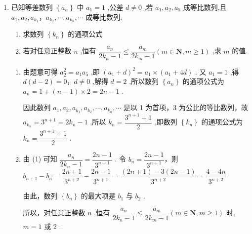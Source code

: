 \begin{enumerate}
\begin{enumerate}
\begin{jieda}
        \end{jieda}
        \item 已知等差数列 $\left\{{a}_{n}\right\}$ 中 ${a}_{1} = 1$ ,公差 $d \neq  0$ ,若 ${a}_{1},{a}_{2},{a}_{5}$ 成等比数列,且 ${a}_{1},{a}_{2},{a}_{{k}_{1}}$，${a}_{{k}_{2}},\cdots ,{a}_{{k}_{n}},\cdots$ 成等比数列.
        \begin{enumerate}
            \item 求数列 $\left\{  {k}_{n}\right\}$ 的通项公式
            \item 若对任意正整数 $n$ ,恒有 $\dfrac{{a}_{n}}{2{k}_{n} - 1} \leq  \dfrac{{a}_{m}}{2{k}_{m} - 1}\left( {m \in  \mathbf{N},m \geq  1}\right)$ ,求 $m$ 的值.
        \end{enumerate}
        \begin{jieda}
            \begin{enumerate}
                \item 由题意可得 ${a}_{2}^{2} = {a}_{1}{a}_{5}$ ,即 ${\left( {a}_{1} + d\right) }^{2} = {a}_{1} \times  \left( {{a}_{1} + {4d}}\right)$ . 又 ${a}_{1} = 1$ ,得 $d\left( {d - 2}\right)  = 0$，$d \neq  0$ ,解得 $d = 2$ ,所以数列 $\left\{  {a}_{n}\right\}$ 的通项公式为 ${a}_{n} = 1 + \left( {n - 1}\right)  \times  2 = {2n} - 1$ .
                
                因此数列 ${a}_{1},{a}_{2},{a}_{{k}_{1}},{a}_{{k}_{2}},\cdots ,{a}_{{k}_{n}},\cdots$ 是以 1 为首项，3 为公比的等比数列，故${a}_{{k}_{n}} = {3}^{n + 1} = 2{k}_{n} - 1$ ,所以 ${k}_{n} = \dfrac{{3}^{n + 1} + 1}{2}$ ,即数列 $\left\{  {k}_{n}\right\}$ 的通项公式为 ${k}_{n} = \dfrac{{3}^{n + 1} + 1}{2}$ .
    
                \item 由 (1) 可知 $\dfrac{{a}_{n}}{2{k}_{n} - 1} = \dfrac{{2n} - 1}{{3}^{n + 1}}$ .
                令 ${b}_{n} = \dfrac{{2n} - 1}{{3}^{n + 1}}$，则$b_{n+1} - b_n = \dfrac{{2n} + 1}{{3}^{n + 2}} - \dfrac{{2n} - 1}{{3}^{n + 1}} = \dfrac{({2n} + 1) - 3(2n-1)}{{3}^{n + 2}} = \dfrac{4-4n}{{3}^{n + 2}}$
                由此，数列 $\left\{  {b}_{n}\right\}$ 的最大项是 ${b}_{1}$ 与 ${b}_{2}$ .
                
                所以，对任意正整数 $n$ ,恒有 $\dfrac{{a}_{n}}{2{k}_{n} - 1} \leq  \dfrac{{a}_{m}}{2{k}_{m} - 1}\left( {m \in  \mathbf{N},m \geq  1}\right)$ 时, $m = 1$ 或 2 .
            \end{enumerate}
        \end{jieda}
    \end{enumerate}
    

\end{enumerate}

